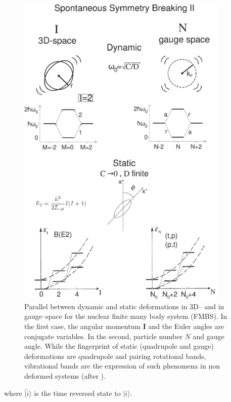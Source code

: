 \begin{figure}
\centerline{\includegraphics*[width=0.9\textwidth,angle=0]{nutshell/figs/fig1D1x.pdf}}
\caption{Parallel between dynamic and static deformations in 3D-- and in gauge--space for the nuclear finite many body system (FMBS). In the first case, the angular momentum $\mathbf{I}$ and the Euler angles are conjugate variables. In the second, particle number $N$ and gauge angle. While the fingerprint of static (quadrupole and gauge) deformations are quadrupole and pairing rotational bands, vibrational bands are the expression of such phenomena in non deformed systems (after \cite{Broglia:73}).}\label{fig1D1}
\end{figure}
where $|\tilde i\rangle$  is the time reversed state to  $| i\rangle$.


